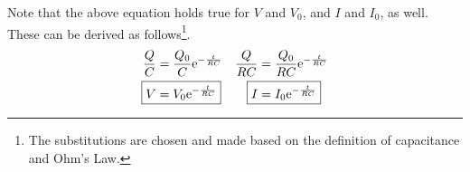 \documentclass{article}
\newcommand{\e}[1][]{\text{e}^{#1}}
\begin{document}
Note that the above equation holds true for $V$ and $V_0$, and $I$ and $I_0$, as well. These can be derived as follows\footnote{The substitutions are chosen and made based on the definition of capacitance and Ohm's Law.}.
\begin{align*}
    \frac{Q}{C} &= \frac{Q_0}{C}\e[-\frac{t}{RC}]&
        \frac{Q}{RC} &= \frac{Q_0}{RC}\e[-\frac{t}{RC}]\\
    \Aboxed{V &= V_0\e[-\frac{t}{RC}]}&
        \Aboxed{I &= I_0\e[-\frac{t}{RC}]}\\
\end{align*}
\end{document}
